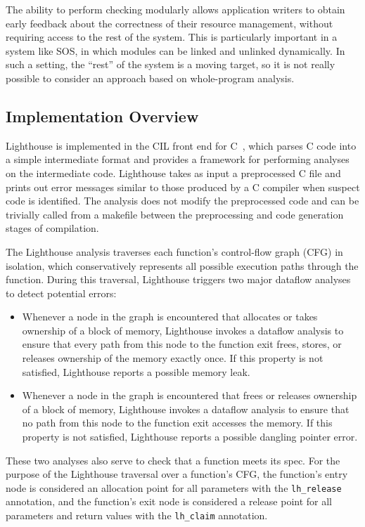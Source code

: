 The ability to perform checking modularly allows application writers
to obtain early feedback about the correctness of their resource
management, without requiring access to the rest of the system.  This
is particularly important in a system like SOS, in which modules can
be linked and unlinked dynamically.  In such a setting, the ``rest''
of the system is a moving target, so it is not really possible to
consider an approach based on whole-program analysis.


\subsection{Implementation Overview}

%
Lighthouse is implemented in the CIL front end for C~\cite{CIL},
which parses C code into a simple intermediate format and provides a
framework for performing analyses on the intermediate code. 
%
Lighthouse takes as input a preprocessed C file and prints out error
messages similar to those produced by a C compiler when suspect
code is identified.
%
The analysis does not modify the preprocessed code and can be
trivially called from a makefile between the preprocessing and code
generation stages of compilation.


The Lighthouse analysis traverses each function's control-flow graph
(CFG) in isolation, which conservatively represents all possible execution
paths through the function.  During this traversal, Lighthouse
triggers two major dataflow analyses to detect potential errors:

\begin{itemize}
\item Whenever a node in the graph is
encountered that allocates or takes ownership of a block of memory,
Lighthouse invokes a dataflow analysis to ensure that every path from
this node to the function exit frees, stores, or releases ownership
of the memory exactly once.  If this property is not satisfied,
Lighthouse reports a possible memory leak.

\item Whenever a node in the graph is encountered that frees or
  releases ownership of a block of memory, Lighthouse invokes a
  dataflow analysis to ensure that no path from this node to the
  function exit accesses the memory.  If this property is not
  satisfied, Lighthouse reports a possible dangling pointer error.
\end{itemize}

These two analyses also serve to check that a function meets its
spec.  For the purpose of the Lighthouse traversal over a function's CFG,
the function's entry node is considered
an allocation point for all parameters with the {\tt lh\_release}
annotation, and the function's exit node is considered a release point
for all parameters and return values with the {\tt lh\_claim}
annotation.  



